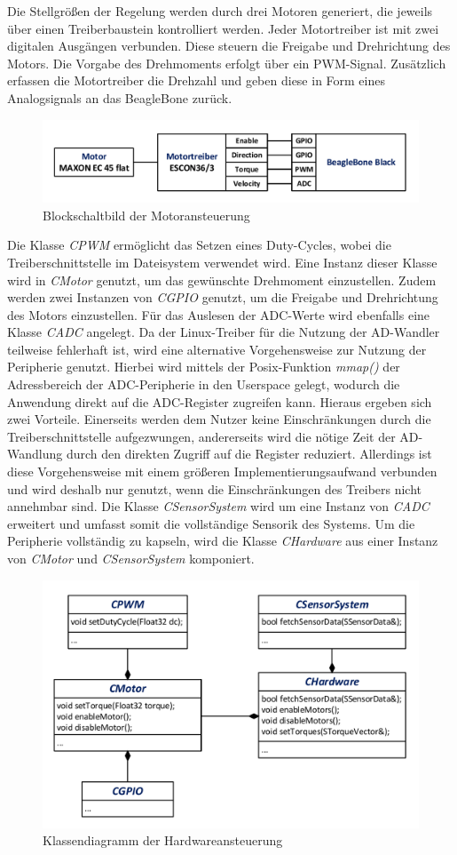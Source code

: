 Die Stellgrößen der Regelung werden durch drei Motoren generiert, die jeweils über einen Treiberbaustein kontrolliert werden. Jeder Motortreiber ist mit zwei digitalen Ausgängen verbunden. Diese steuern die Freigabe und Drehrichtung des Motors. Die Vorgabe des Drehmoments erfolgt über ein PWM-Signal. Zusätzlich erfassen die Motortreiber die Drehzahl und geben diese in Form eines Analogsignals an das BeagleBone zurück.
\begin{figure}[!h]
\centering
\includegraphics[width=0.7\linewidth]{img/SW_0_Motoren_BSB.pdf}
\caption{Blockschaltbild der Motoransteuerung} 
\end{figure}
Die Klasse \textit{CPWM} ermöglicht das Setzen eines Duty-Cycles, wobei die Treiberschnittstelle im Dateisystem verwendet wird. Eine Instanz dieser Klasse wird in \textit{CMotor} genutzt, um das gewünschte Drehmoment einzustellen. Zudem werden zwei Instanzen von \textit{CGPIO} genutzt, um die Freigabe und Drehrichtung des Motors einzustellen. Für das Auslesen der ADC-Werte wird ebenfalls eine Klasse \textit{CADC} angelegt. Da der Linux-Treiber für die Nutzung der AD-Wandler teilweise fehlerhaft ist, wird eine alternative Vorgehensweise zur Nutzung der Peripherie genutzt. Hierbei wird mittels der Posix-Funktion \textit{mmap()} der Adressbereich der ADC-Peripherie in den Userspace gelegt, wodurch die Anwendung direkt auf die ADC-Register zugreifen kann. Hieraus ergeben sich zwei Vorteile. Einerseits werden dem Nutzer keine Einschränkungen durch die Treiberschnittstelle aufgezwungen, andererseits wird die nötige Zeit der AD-Wandlung durch den direkten Zugriff auf die Register reduziert. Allerdings ist diese Vorgehensweise mit einem größeren Implementierungsaufwand verbunden und wird deshalb nur genutzt, wenn die Einschränkungen des Treibers nicht annehmbar sind.
Die Klasse \textit{CSensorSystem} wird um eine Instanz von \textit{CADC} erweitert und umfasst somit die vollständige Sensorik des Systems. Um die Peripherie vollständig zu kapseln, wird die Klasse \textit{CHardware} aus einer Instanz von \textit{CMotor} und \textit{CSensorSystem} komponiert.
\begin{figure}[!h]
\centering
\includegraphics[width=0.7\linewidth]{img/SW_0_Hardware_KD.pdf}
\caption{Klassendiagramm der Hardwareansteuerung}
\end{figure}